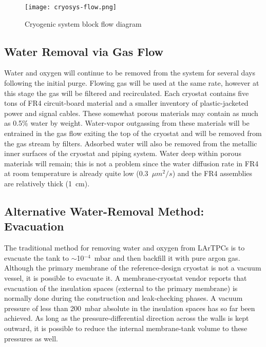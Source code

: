 \begin{figure}[htbp]
\centering
\texttt{[image: cryosys-flow.png]} 
\caption{Cryogenic system block flow diagram}
\label{fig:v5ch2-LBNF-cryo-process-2014}
\end{figure}



\subsection{Water Removal via Gas Flow}

Water and oxygen will continue to be removed from the system for several days following the
initial purge. Flowing gas will be used at the same rate, however at this stage the gas will
be filtered and recirculated. Each cryostat contains five tons of FR4
circuit-board material and a
smaller inventory of plastic-jacketed power and signal cables. These somewhat porous
materials may contain as much as 0.5\% water by weight. Water-vapor outgassing from these
materials will be entrained in the gas flow exiting
the top of the cryostat and will be removed
from the gas stream by filters. Adsorbed water will also be removed from the metallic inner
surfaces of the cryostat and piping system. Water deep within porous materials will remain;
this is not a problem since
the water diffusion rate in FR4 at room temperature is already quite low (0.3~$\mu m^2 /s$) and the FR4 assemblies are relatively thick (1~cm).

\subsection{Alternative Water-Removal Method: Evacuation}

The traditional method for removing water and oxygen from LArTPCs is to evacuate the tank to $\sim$10$^{-4}$~mbar  and then backfill it with pure argon gas. Although the primary membrane of the reference-design cryostat is not a vacuum vessel, it is possible to evacuate it.  A membrane-cryostat vendor reports that evacuation of  the insulation spaces (external to the primary membrane) is normally done during the construction and leak-checking phases.  A vacuum pressure of less than 200~mbar absolute in the insulation spaces has so far been achieved.  As long as the pressure-differential direction across the walls is kept outward, it is possible to reduce the internal membrane-tank volume to these pressures as well.  

